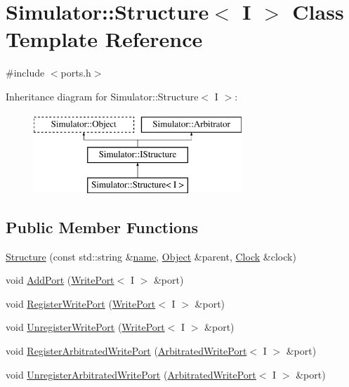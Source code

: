 \hypertarget{singleton_simulator_1_1_structure}{\section{Simulator\+:\+:Structure$<$ I $>$ Class Template Reference}
\label{singleton_simulator_1_1_structure}
}


{\ttfamily \#include $<$ports.\+h$>$}

Inheritance diagram for Simulator\+:\+:Structure$<$ I $>$\+:\begin{figure}[H]
\begin{center}
\leavevmode
\includegraphics[height=3.000000cm]{singleton_simulator_1_1_structure}
\end{center}
\end{figure}
\subsection*{Public Member Functions}
\begin{DoxyCompactItemize}
\item 
\hyperlink{singleton_simulator_1_1_structure_a6119e2926c7c3166866de117c9a86895}{Structure} (const std\+::string \&\hyperlink{mtconf_8c_a8f8f80d37794cde9472343e4487ba3eb}{name}, \hyperlink{class_simulator_1_1_object}{Object} \&parent, \hyperlink{class_simulator_1_1_clock}{Clock} \&clock)
\item 
void \hyperlink{singleton_simulator_1_1_structure_aaf6c37cfac6bbdd2939c3b3d0f84da2d}{Add\+Port} (\hyperlink{class_simulator_1_1_write_port}{Write\+Port}$<$ I $>$ \&port)
\item 
void \hyperlink{singleton_simulator_1_1_structure_a2ff07405a046c8292bf1603060fb922b}{Register\+Write\+Port} (\hyperlink{class_simulator_1_1_write_port}{Write\+Port}$<$ I $>$ \&port)
\item 
void \hyperlink{singleton_simulator_1_1_structure_a1c8757302ae9548bb8f1d80a5b5ae96c}{Unregister\+Write\+Port} (\hyperlink{class_simulator_1_1_write_port}{Write\+Port}$<$ I $>$ \&port)
\item 
void \hyperlink{singleton_simulator_1_1_structure_abf97de2aaa57624cc52f399d55a67dd0}{Register\+Arbitrated\+Write\+Port} (\hyperlink{singleton_simulator_1_1_arbitrated_write_port}{Arbitrated\+Write\+Port}$<$ I $>$ \&port)
\item 
void \hyperlink{singleton_simulator_1_1_structure_a633daa04921dd0f08ff9781fb951bff4}{Unregister\+Arbitrated\+Write\+Port} (\hyperlink{singleton_simulator_1_1_arbitrated_write_port}{Arbitrated\+Write\+Port}$<$ I $>$ \&port)
\end{DoxyCompactItemize}
